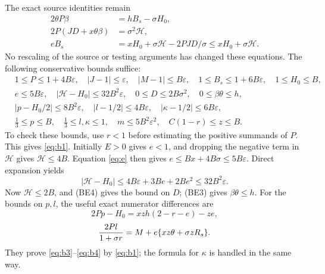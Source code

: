 \documentclass[10pt]{article}
\newcommand{\eps}{\varepsilon}
\begin{document}
The exact source identities remain
\begin{align}
 2\theta P\beta&=hB_s-\sigma H_0,\tag{BE3}\\
 2P(JD+x\theta\beta)&=\sigma^2\mathcal H,\tag{BE4}\\
 eB_s&=xH_0+\sigma\mathcal H-2PJD/\sigma
                      \le xH_0+\sigma\mathcal H.\label{eq:e}
\end{align}
No rescaling of the source or testing arguments has changed these equations.
The following conservative bounds suffice:
\begin{align}
 &1\le P\le1+4B\eps,\quad |J-1|\le\eps,\quad
 |M-1|\le B\eps,\quad1\le B_s\le1+6B\eps,
 \quad1\le H_0\le B,\label{eq:b1}\\
 &e\le5B\eps,\quad |\mathcal H-H_0|\le32B^2\eps,
 \quad0\le D\le2B\sigma^2,\quad0\le\beta\theta\le h,
                                                        \label{eq:b2}\\
 &|p-H_0/2|\le8B^2\eps,\quad |l-1/2|\le4B\eps,
 \quad |\kappa-1/2|\le6B\eps,\label{eq:b3}\\
 &\tfrac13\le p\le B,\quad\tfrac13\le l,\kappa\le1,
 \quad m\le5B^2\eps^2,\quad C(1-r)\le z\le B.\label{eq:b4}
\end{align}
To check these bounds, use $r<1$ before estimating the positive
summands of $P$. This gives \eqref{eq:b1}. Initially $E>0$ gives
$e<1$, and dropping the negative term in $\mathcal H$ gives
$\mathcal H\le4B$. Equation \eqref{eq:e} then gives
$e\le Bx+4B\sigma\le5B\eps$. Direct expansion yields
\[
 |\mathcal H-H_0|\le4B\eps+3Be+2Be^2\le32B^2\eps.
\]
Now $\mathcal H\le2B$, and (BE4) gives the bound on $D$; (BE3)
gives $\beta\theta\le h$. For the bounds on $p,l$, the useful exact
numerator differences are
\[
 2Pp-H_0=xzh(2-r-e)-ze,
\]
\[
 {2Pl\over1+\sigma r}=M+e\{xz\theta+\sigma zR_s\}.
\]
They prove \eqref{eq:b3}--\eqref{eq:b4} by \eqref{eq:b1}; the
formula for $\kappa$ is handled in the same way.
\end{document}

